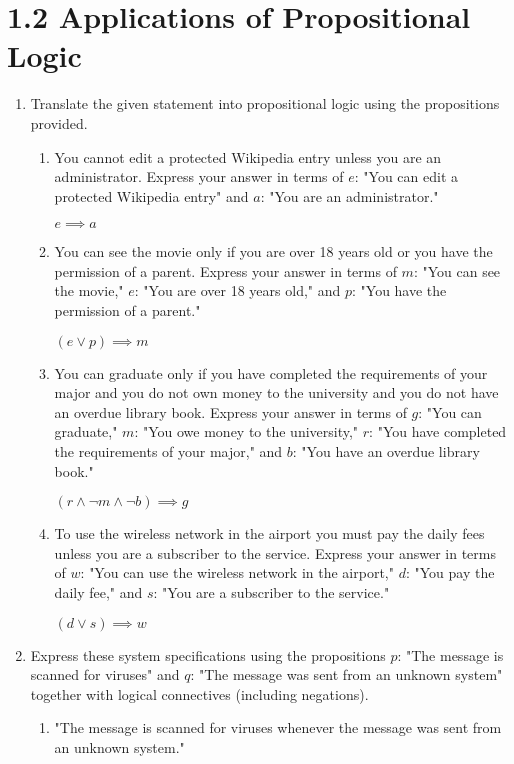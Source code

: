 \documentclass[11pt]{article}
\begin{document}
\section*{\textbf{1.2 Applications of Propositional Logic}}
\begin{enumerate}[label=\textbf{\arabic*.}]
	\item Translate the given statement into propositional logic using the propositions provided.
	\begin{enumerate}[label=\textbf{\alph*)}]
		\item You cannot edit a protected Wikipedia entry unless you are an administrator. Express your answer in terms of $e$: "You can edit a protected Wikipedia entry" and $a$: "You are an administrator."
		
		$e \implies a$
		
		\item You can see the movie only if you are over 18 years old or you have the permission of a parent. Express your answer in terms of $m$: "You can see the movie," $e$: "You are over 18 years old," and $p$: "You have the permission of a parent."
		
		$(e \lor p) \implies m$
		
		\item You can graduate only if you have completed the requirements of your major and you do not own money to the university and you do not have an overdue library book. Express your answer in terms of $g$: "You can graduate," $m$: "You owe money to the university," $r$: "You have completed the requirements of your major," and $b$: "You have an overdue library book."
		
		$(r \land \neg m \land \neg b) \implies g$
		
		\item To use the wireless network in the airport you must pay the daily fees unless you are a subscriber to the service. Express your answer in terms of $w$: "You can use the wireless network in the airport," $d$: "You pay the daily fee," and $s$: "You are a subscriber to the service."
		
		$(d \lor s) \implies w$
	\end{enumerate}

	\item Express these system specifications using the propositions $p$: "The message is scanned for viruses" and $q$: "The message was sent from an unknown system" together with logical connectives (including negations).
	\begin{enumerate}[label=\textbf{\alph*)}]
		\item "The message is scanned for viruses whenever the message was sent from an unknown system."
		

\end{enumerate}
\end{enumerate}
\end{document}
